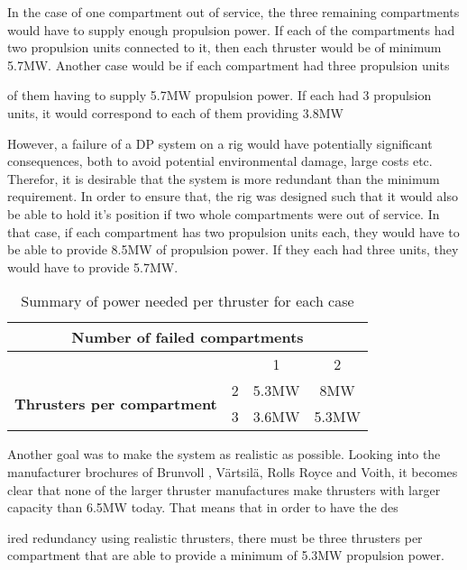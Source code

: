 In the case of one compartment out of service, the three remaining compartments would have to supply enough propulsion power. If each of the compartments had two propulsion units connected to it, then each thruster would be of minimum 5.7MW. Another case would be if each compartment had three propulsion units 

of them having to supply 5.7MW propulsion power. If each had 3 propulsion units, it would correspond to each of them providing 3.8MW  


However, a failure of a DP system on a rig would have potentially significant consequences, both to avoid potential environmental damage, large costs etc. Therefor, it is desirable that the system is more redundant than the minimum requirement. In order to ensure that, the rig was designed such that it would also be able to hold it's position if two whole compartments were out of service. In that case, if each compartment has two propulsion units each, they would have to be able to provide 8.5MW of propulsion power. If they each had three units, they would have to provide 5.7MW. 

\begin{table}[h]
    \centering
    \begin{tabular}{c c c c}
         \multicolumn{4}{c}{\textbf{Number of failed compartments}} \\
         \toprule
            &       & 1         & 2          \\
        \midrule
        \multirow{3}{7em}{\textbf{Thrusters per compartment}}
            & 2     & 5.3MW     & 8MW       \\
            & 3     & 3.6MW     & 5.3MW     
        
    \end{tabular}
    \caption{Summary of power needed per thruster for each case}
    \label{tab:powerWorstCaseFailure}
\end{table}


Another goal was to make the system as realistic as possible. Looking into the manufacturer brochures of Brunvoll , Värtsilä\cite{WärtsiläThrusters}, Rolls Royce\cite{RollsRoyceThrusters} and Voith\cite{VoithThrusters}, it becomes clear that none of the larger thruster manufactures make thrusters with larger capacity than 6.5MW today. That means that in order to have the des

ired redundancy using realistic thrusters, there must be three thrusters per compartment that are able to provide a minimum of 5.3MW propulsion power. 



